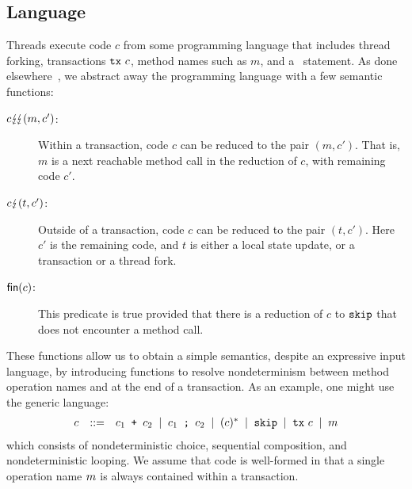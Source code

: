 \subsection{Language}




Threads execute code $c$ from some programming language that
includes thread forking, transactions $\texttt{tx}\ c$,
method names such as $m$, and a \skipt\ statement. As done
elsewhere~\cite{pmpy}, we abstract away the programming
  language with a few semantic functions:
%
\begin{description}
\item[$c \lightning\!\lightning (m,c')$:] Within a transaction, code $c$ can be reduced to the pair
  $(m,c')$.  That is, $m$ is a next reachable method call in the
  reduction of $c$, with remaining code $c'$.

\item[$c \lightning (t,c')$:] Outside of a transaction, code $c$ can be reduced to the pair
  $(t,c')$.  Here $c'$ is the remaining code, and $t$ is either
  a local state update, or a transaction or a thread fork.

\item[$\textsf{fin}(c)$:] This predicate is true provided that there is a
  reduction of $c$ to $\texttt{skip}$ that does not encounter a method call.
\end{description}
%
These functions allow us to obtain a simple semantics, despite an
expressive input language, by introducing functions to resolve
nondeterminism between method operation names and at the end of a
transaction. As an example, one might use the generic language:
\[ \begin{array}{rcl}
  c &::=& c_1\texttt{ + } c_2 \;\mid\; c_1 \texttt{ ; } c_2
      \;\mid\; (c)^* \;\mid\; \texttt{skip} \;\mid\; \texttt{tx}\ c \;\mid\; m
\end{array} \]
%
which consists of nondeterministic choice, sequential
composition, and nondeterministic looping.
%
We assume that code is well-formed in that a single operation name $m$ 
is always contained within a transaction. 



\newcommand\myT{T}
\newcommand\fork[1]{\texttt{fork }#1}
\newcommand\local[1]{\texttt{local }#1}
\newcommand\txnstep[1]{\;\underrightharpdown{\;#1\;}\;}
\newcommand\txnstept[1]{\underrightharpdown{\;#1\;}}



